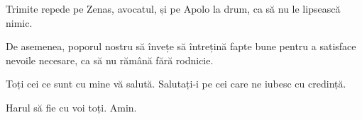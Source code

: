 {Trimite repede pe Zenas, avocatul, și pe Apolo la drum, ca să nu le lipsească nimic.

De asemenea, poporul nostru să învețe să întrețină fapte bune pentru a satisface nevoile necesare, ca să nu rămână fără rodnicie.


\par }{\PP {}Toți cei ce sunt cu mine vă salută. Salutați-i pe cei care ne iubesc cu credință.

\par }{\PP Harul să fie cu voi toți. Amin.


\par }